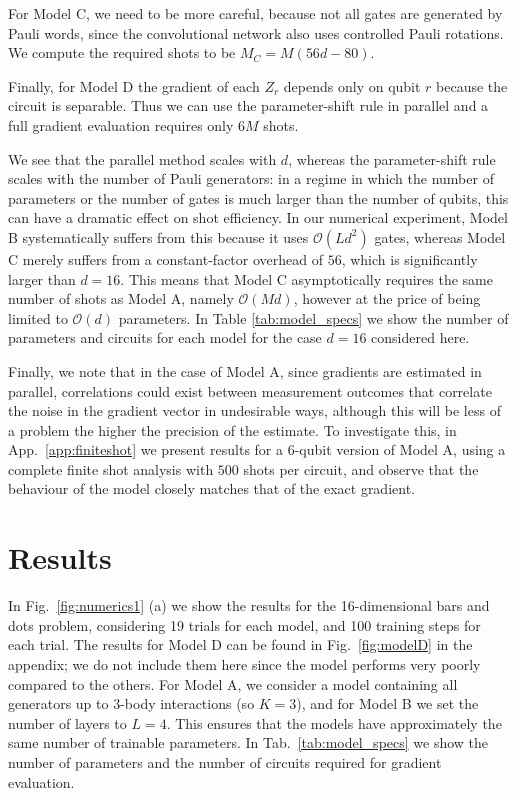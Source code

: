 \documentclass[a4paper,twocolumn,11pt]{quantumarticle}
\begin{document}
For Model C, we need to be more careful, because not all gates are generated by Pauli words, since the convolutional network also uses controlled Pauli rotations. We compute the required shots to be $M_C = M(56d-80)$.

Finally, for Model D the gradient of each $Z_r$ depends only on qubit $r$ because the circuit is separable. Thus we can use the parameter-shift rule in parallel and a full gradient evaluation requires only $6M$ shots.

We see that the parallel method scales with $d$, whereas the parameter-shift rule scales with the number of Pauli generators: in a regime in which the number of parameters or the number of gates is much larger than the number of qubits, this can have a dramatic effect on shot efficiency. In our numerical experiment, Model B systematically suffers from this because it uses $\mathcal{O}(Ld^2)$ gates, whereas Model C merely suffers from a constant-factor overhead of $56$, which is significantly larger than $d=16$.
This means that Model C asymptotically requires the same number of shots as Model A, namely $\mathcal{O}(Md)$, however at the price of being limited to $\mathcal{O}(d)$ parameters. In Table \ref{tab:model_specs} we show the number of parameters and circuits for each model for the case $d=16$ considered here. 

Finally, we note that in the case of Model A, since gradients are estimated in parallel, correlations could exist between measurement outcomes that correlate the noise in the gradient vector in undesirable ways, although this will be less of a problem the higher the precision of the estimate. To investigate this, in App.\ \ref{app:finiteshot} we present results for a 6-qubit version of Model A, using a complete finite shot analysis with $500$ shots per circuit, and observe that the behaviour of the model closely matches that of the exact gradient.

\section{Results}

In Fig.\ \ref{fig:numerics1} (a) we show the results for the 16-dimensional bars and dots problem, considering 19 trials for each model, and 100 training steps for each trial.
The results for Model D can be found in Fig.\ \ref{fig:modelD} in the appendix; we do not include them here since the model performs very poorly compared to the others. 
For Model A, we consider a model containing all generators up to $3$-body interactions (so $K=3$), and for Model B we set the number of layers to $L=4$. This ensures that the models have approximately the same number of trainable parameters. In Tab.\ \ref{tab:model_specs} we show the number of parameters and the number of circuits required for gradient evaluation.
\end{document}
